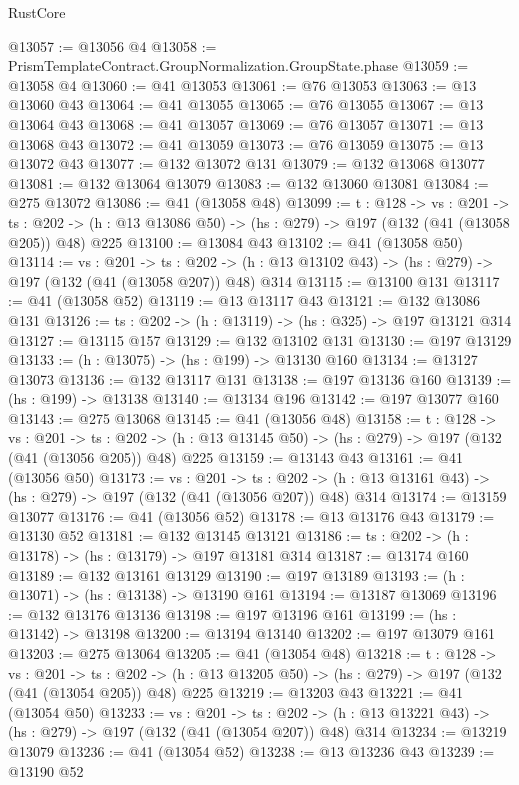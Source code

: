 \begin{lexlean}{RustCore}
\begin{coremodule}
@13057 := @13056 @4
@13058 := PrismTemplateContract.GroupNormalization.GroupState.phase
@13059 := @13058 @4
@13060 := @41 @13053
@13061 := @76 @13053
@13063 := @13 @13060 @43
@13064 := @41 @13055
@13065 := @76 @13055
@13067 := @13 @13064 @43
@13068 := @41 @13057
@13069 := @76 @13057
@13071 := @13 @13068 @43
@13072 := @41 @13059
@13073 := @76 @13059
@13075 := @13 @13072 @43
@13077 := @132 @13072 @131
@13079 := @132 @13068 @13077
@13081 := @132 @13064 @13079
@13083 := @132 @13060 @13081
@13084 := @275 @13072
@13086 := @41 (@13058 @48)
@13099 := {t : @128} ->
  {vs : @201} ->
  {ts : @202} -> (h : @13 @13086 @50) -> (hs : @279) -> @197 (@132 (@41 (@13058 @205)) @48) @225
@13100 := @13084 @43
@13102 := @41 (@13058 @50)
@13114 := {vs : @201} ->
  {ts : @202} -> (h : @13 @13102 @43) -> (hs : @279) -> @197 (@132 (@41 (@13058 @207)) @48) @314
@13115 := @13100 @131
@13117 := @41 (@13058 @52)
@13119 := @13 @13117 @43
@13121 := @132 @13086 @131
@13126 := {ts : @202} -> (h : @13119) -> (hs : @325) -> @197 @13121 @314
@13127 := @13115 @157
@13129 := @132 @13102 @131
@13130 := @197 @13129
@13133 := (h : @13075) -> (hs : @199) -> @13130 @160
@13134 := @13127 @13073
@13136 := @132 @13117 @131
@13138 := @197 @13136 @160
@13139 := (hs : @199) -> @13138
@13140 := @13134 @196
@13142 := @197 @13077 @160
@13143 := @275 @13068
@13145 := @41 (@13056 @48)
@13158 := {t : @128} ->
  {vs : @201} ->
  {ts : @202} -> (h : @13 @13145 @50) -> (hs : @279) -> @197 (@132 (@41 (@13056 @205)) @48) @225
@13159 := @13143 @43
@13161 := @41 (@13056 @50)
@13173 := {vs : @201} ->
  {ts : @202} -> (h : @13 @13161 @43) -> (hs : @279) -> @197 (@132 (@41 (@13056 @207)) @48) @314
@13174 := @13159 @13077
@13176 := @41 (@13056 @52)
@13178 := @13 @13176 @43
@13179 := @13130 @52
@13181 := @132 @13145 @13121
@13186 := {ts : @202} -> (h : @13178) -> (hs : @13179) -> @197 @13181 @314
@13187 := @13174 @160
@13189 := @132 @13161 @13129
@13190 := @197 @13189
@13193 := (h : @13071) -> (hs : @13138) -> @13190 @161
@13194 := @13187 @13069
@13196 := @132 @13176 @13136
@13198 := @197 @13196 @161
@13199 := (hs : @13142) -> @13198
@13200 := @13194 @13140
@13202 := @197 @13079 @161
@13203 := @275 @13064
@13205 := @41 (@13054 @48)
@13218 := {t : @128} ->
  {vs : @201} ->
  {ts : @202} -> (h : @13 @13205 @50) -> (hs : @279) -> @197 (@132 (@41 (@13054 @205)) @48) @225
@13219 := @13203 @43
@13221 := @41 (@13054 @50)
@13233 := {vs : @201} ->
  {ts : @202} -> (h : @13 @13221 @43) -> (hs : @279) -> @197 (@132 (@41 (@13054 @207)) @48) @314
@13234 := @13219 @13079
@13236 := @41 (@13054 @52)
@13238 := @13 @13236 @43
@13239 := @13190 @52

\end{coremodule}
\end{lexlean}
